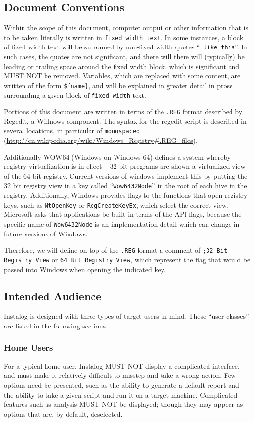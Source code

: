 \documentclass[letterpaper,12pt]{article}
\newcommand{\var}[1]{\texttt{\$\{#1\}}}
\begin{document}
\subsection{Document Conventions}
Within the scope of this document, computer output or other information that is
to be taken literally is written in \texttt{fixed width text}. In some
instances, a block of fixed width text will be surrouned by non-fixed width
quotes ``\texttt{ like this}''. In such cases, the quotes are not significant,
and there will there will (typically) be leading or trailing space around the
fixed width block, which is significant and MUST NOT be removed. Variables,
which are replaced with some content, are written of the form \var{name}, and
will be explained in greater detail in prose surrounding a given block of
\texttt{fixed width} text.

Portions of this document are written in terms of the \verb|.REG| format
described by Regedit, a Widnows component. The syntax for the regedit script is
described in several locations, in particular  of \texttt{monospaced}
(\url{http://en.wikipedia.org/wiki/Windows_Registry#.REG_files}).

Additionally WOW64 (Windows on Windows 64) defines a system whereby registry
virtualization is in effect -- 32 bit programs are shown a virtualized view of
the 64 bit registry. Current versions of windows implement this by putting the
32 bit registry view in a key called ``\verb|Wow6432Node|'' in the root of each
hive in the registry. Additionally, Windows provides flags to the functions that open
registry keys, such as \verb|NtOpenKey| or \verb|RegCreateKeyEx|, which select
the correct view. Microsoft asks that applications be built in terms of the API
flags, because the specific name of \verb|Wow6432Node| is an implementation
detail which can change in future versions of Windows.

Therefore, we will define on top of the \verb|.REG| format a comment of
\verb|;32 Bit Registry View| or \verb|64 Bit Registry View|, which represent the
flag that would be passed into Windows when opening the indicated key.

\subsection{Intended Audience}
Instalog is designed with three types of target users in mind. These ``user
classes'' are listed in the following sections.

\subsubsection{Home Users}
For a typical home user, Instalog MUST NOT display a complicated interface, and
must make it relatively difficult to misstep and take a wrong action. Few
options need be presented, such as the ability to generate a default report and
the ability to take a given script and run it on a target machine. Complicated
features such as analysis MUST NOT be displayed; though they may appear as
options that are, by default, deselected.
\end{document}
